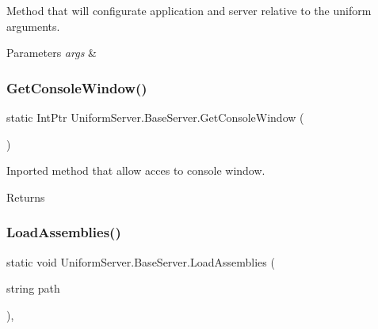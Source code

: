 Method that will configurate application and server relative to the uniform arguments. 


\begin{DoxyParams}{Parameters}
{\em args} & \\
\hline
\end{DoxyParams}
\mbox{\label{class_uniform_server_1_1_base_server_a1b7d5587de4974fad2ec366a571791e0}} 
\subsubsection{\texorpdfstring{Get\+Console\+Window()}{GetConsoleWindow()}}
{\footnotesize\ttfamily static Int\+Ptr Uniform\+Server.\+Base\+Server.\+Get\+Console\+Window (\begin{DoxyParamCaption}{ }\end{DoxyParamCaption})\hspace{0.3cm}{\ttfamily [protected]}}



Inported method that allow acces to console window. 

\begin{DoxyReturn}{Returns}

\end{DoxyReturn}
\mbox{\label{class_uniform_server_1_1_base_server_a22b92ad517cd1003fe4fe3c86d857169}} 
\subsubsection{\texorpdfstring{Load\+Assemblies()}{LoadAssemblies()}}
{\footnotesize\ttfamily static void Uniform\+Server.\+Base\+Server.\+Load\+Assemblies (\begin{DoxyParamCaption}\item[{string}]{path }\end{DoxyParamCaption})\hspace{0.3cm}{\ttfamily [static]}, {\ttfamily [protected]}}



